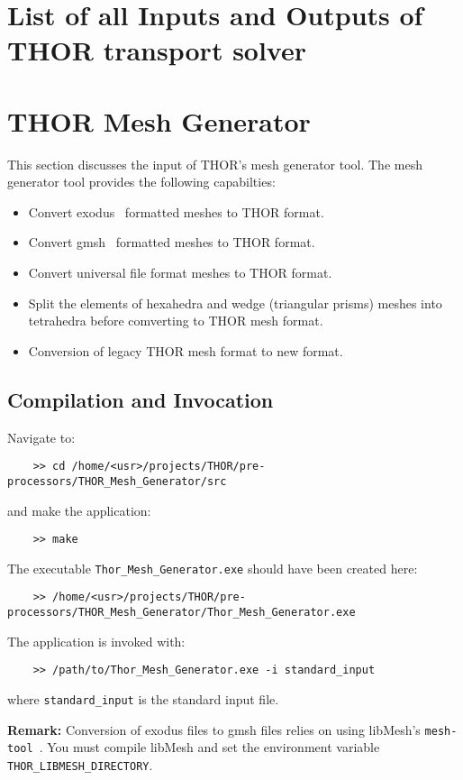 \section{List of all Inputs and Outputs of THOR transport solver}

\section{THOR Mesh Generator}
This section discusses the input of THOR's mesh generator tool. The mesh generator tool provides the following capabilties:
\begin{itemize}
    \item Convert exodus~\cite{exodus_format} formatted meshes to THOR format.
    \item Convert gmsh~\cite{gmsh_ref} formatted meshes to THOR format.
    \item Convert universal file format meshes to THOR format.
    \item Split the elements of hexahedra and wedge (triangular prisms) meshes into tetrahedra before comverting to THOR mesh format.
    \item Conversion of legacy THOR mesh format to new format.
\end{itemize}

\subsection{Compilation and Invocation}
Navigate to:
\begin{verbatim}
    >> cd /home/<usr>/projects/THOR/pre-processors/THOR_Mesh_Generator/src
\end{verbatim}
and make the application:
\begin{verbatim}
    >> make
\end{verbatim}
The executable \verb"Thor_Mesh_Generator.exe" should have been created here:
\begin{verbatim}
    >> /home/<usr>/projects/THOR/pre-processors/THOR_Mesh_Generator/Thor_Mesh_Generator.exe
\end{verbatim}
The application is invoked with:
\begin{verbatim}
    >> /path/to/Thor_Mesh_Generator.exe -i standard_input
\end{verbatim}
where \verb"standard_input" is the standard input file.

\noindent\textbf{Remark:} Conversion of exodus files to gmsh files relies on using libMesh's \verb"mesh-tool"~\cite{libMeshPaper}. You must compile libMesh and set the environment variable \verb"THOR_LIBMESH_DIRECTORY".

